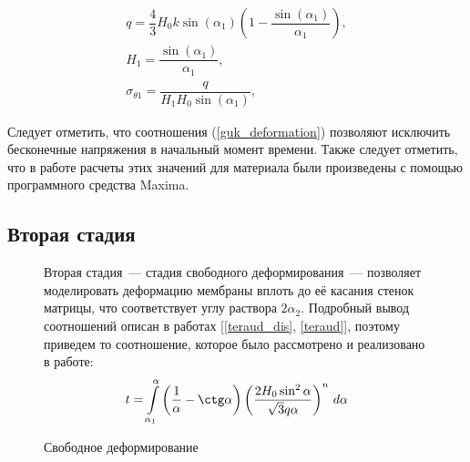 	\begin{equation}
	\begin{split}
		q = \dfrac43 H_0k\sin(\alpha_1)\left(1-\dfrac{\sin(\alpha_1)}{\alpha_1} \right), \\
		H_1 = \dfrac{\sin(\alpha_1)}{\alpha_1},\\
		\sigma_{\theta1} = \dfrac{q}{H_1H_0\sin(\alpha_1)},
	\end{split}
	\label{guk_deformation}
	\end{equation}
	
	Следует отметить, что соотношения (\ref{guk_deformation}) позволяют исключить бесконечные напряжения в начальный момент времени.
	Также следует отметить, что в работе расчеты этих значений для материала были произведены с помощью программного средства Maxima.
	 
	\subsection{Вторая стадия}

	\begin{figure}[h!]
		\begin{minipage}[h]{0.48\linewidth}

				
				\def\svgwidth{\columnwidth}

			\caption{ Свободное деформирование } 
		\end{minipage}
		\hfill
		\begin{minipage}[h]{0.48\linewidth}	
		Вторая стадия~--- стадия свободного деформирования~--- позволяет моделировать 
    	деформацию мембраны вплоть до её касания стенок матрицы, что соответствует углу раствора $2\alpha_2$. Подробный вывод 
    	соотношений описан в работах  [\ref{teraud_dis}, \ref{teraud}], поэтому приведем то соотношение, которое было рассмотрено и реализовано 
    	в работе:
		\begin{equation}
        	t = \int\limits_{\alpha_1}^{\alpha}\left(\dfrac 1\alpha - \ctg\alpha \right)\left( \dfrac{2H_0\sin^2\alpha}{\sqrt 3 q\alpha} 
        	\right)^n\,d\alpha
	        \label{free_deformation_formula}
	    \end{equation}
	
		\end{minipage}
		\label{free_deformation_pic}
	\end{figure}
	
